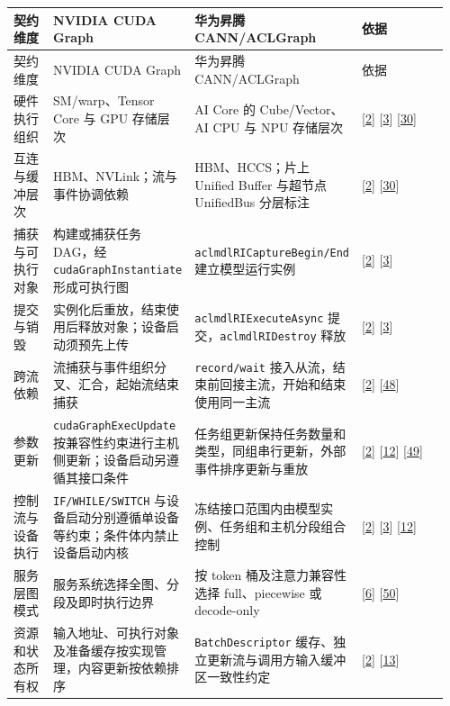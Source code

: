 \documentclass[UTF8,10.5pt,fontset=windows]{ctexart}
\begin{document}
\begin{longtable}[c]{@{}>{\raggedright\arraybackslash}p{0.1248\linewidth}
>{\raggedright\arraybackslash}p{0.2400\linewidth}
>{\raggedright\arraybackslash}p{0.2784\linewidth}
>{\raggedright\arraybackslash}p{0.3168\linewidth}@{}}
\toprule
契约维度 & NVIDIA CUDA Graph & 华为昇腾 CANN/ACLGraph & 依据 \\
\midrule\endfirsthead
\toprule
契约维度 & NVIDIA CUDA Graph & 华为昇腾 CANN/ACLGraph & 依据 \\
\midrule\endhead
\bottomrule\endfoot
\bottomrule\endlastfoot
硬件执行组织 & SM/warp、Tensor Core 与 GPU 存储层次 & AI Core 的
Cube/Vector、AI CPU 与 NPU 存储层次 &
{[}\protect\hyperlink{ref-nvidia2026cuda1303}{2}{]}
{[}\protect\hyperlink{ref-cann900overview}{3}{]}
{[}\protect\hyperlink{ref-zuo2025cloudmatrix384}{30}{]} \\
互连与缓冲层次 & HBM、NVLink；流与事件协调依赖 & HBM、HCCS；片上 Unified
Buffer 与超节点 UnifiedBus 分层标注 &
{[}\protect\hyperlink{ref-nvidia2026cuda1303}{2}{]}
{[}\protect\hyperlink{ref-zuo2025cloudmatrix384}{30}{]} \\
捕获与可执行对象 & 构建或捕获任务 DAG，经 \nolinkurl{cudaGraphInstantiate}
形成可执行图 & \nolinkurl{aclmdlRICaptureBegin/End} 建立模型运行实例 &
{[}\protect\hyperlink{ref-nvidia2026cuda1303}{2}{]}
{[}\protect\hyperlink{ref-cann900overview}{3}{]} \\
提交与销毁 & 实例化后重放，结束使用后释放对象；设备启动须预先上传 &
\nolinkurl{aclmdlRIExecuteAsync} 提交，\nolinkurl{aclmdlRIDestroy} 释放 &
{[}\protect\hyperlink{ref-nvidia2026cuda1303}{2}{]}
{[}\protect\hyperlink{ref-cann900overview}{3}{]} \\
跨流依赖 & 流捕获与事件组织分叉、汇合，起始流结束捕获 &
\nolinkurl{record/wait} 接入从流，结束前回接主流，开始和结束使用同一主流 &
{[}\protect\hyperlink{ref-nvidia2026cuda1303}{2}{]}
{[}\protect\hyperlink{ref-cann910multi}{48}{]} \\
参数更新 & \nolinkurl{cudaGraphExecUpdate}
按兼容性约束进行主机侧更新；设备启动另遵循其接口条件 &
任务组更新保持任务数量和类型，同组串行更新，外部事件排序更新与重放 &
{[}\protect\hyperlink{ref-nvidia2026cuda1303}{2}{]}
{[}\protect\hyperlink{ref-cann910update}{12}{]}
{[}\protect\hyperlink{ref-gitee20264}{49}{]} \\
控制流与设备执行 & \nolinkurl{IF/WHILE/SWITCH}
与设备启动分别遵循单设备等约束；条件体内禁止设备启动内核 &
冻结接口范围内由模型实例、任务组和主机分段组合控制 &
{[}\protect\hyperlink{ref-nvidia2026cuda1303}{2}{]}
{[}\protect\hyperlink{ref-cann900overview}{3}{]}
{[}\protect\hyperlink{ref-cann910update}{12}{]} \\
服务层图模式 & 服务系统选择全图、分段及即时执行边界 & 按 token
桶及注意力兼容性选择 full、piecewise 或 decode-only &
{[}\protect\hyperlink{ref-lmsys2026breakable}{6}{]}
{[}\protect\hyperlink{ref-vllmascend0130}{50}{]} \\
资源和状态所有权 &
输入地址、可执行对象及准备缓存按实现管理，内容更新按依赖排序 &
\nolinkurl{BatchDescriptor} 缓存、独立更新流与调用方输入缓冲区一致性约定 &
{[}\protect\hyperlink{ref-nvidia2026cuda1303}{2}{]}
{[}\protect\hyperlink{ref-vllmascend0130impl}{13}{]} \\
\end{longtable}
\endgroup
\end{document}
